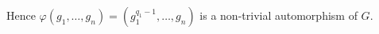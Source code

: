 \documentclass[11pt]{article} \usepackage{amssymb}
\renewcommand{\phi}{\varphi}
\begin{document}
\begin{enumerate}
\begin{itemize}
\begin{itemize}
      Hence $\phi(g_1,\ldots,g_n)=(g_1^{q_1-1},\ldots,g_n)$ is a non-trivial
      automorphism of $G$.
    \end{itemize}
  \end{itemize}


  
\end{enumerate}
\end{document}
